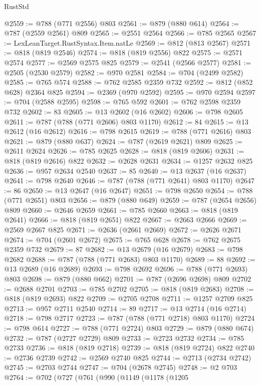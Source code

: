 \begin{lexlean}{RustStd}
\begin{coremodule}
@2559 := @788 (@771 @2556) @803
@2561 := @879 (@880 @614)
@2564 := @787 (@2559 @2561) @809
@2565 := @2551 @2564
@2566 := @785 @2565
@2567 := LexLeanTarget.RustSyntax.Item.natLe
@2569 := @812 (@813 @2567)
@2571 := @818 (@819 @2546)
@2574 := @818 (@819 @2556) @822
@2575 := @2571 @2574
@2577 := @2569 @2575 @825
@2579 := @2541 (@2566 @2577)
@2581 := @2505 (@2530 @2579)
@2582 := @970 @2581
@2584 := @704 (@2499 @2582)
@2585 := @765 @574
@2588 := @762 @2585 @2359 @732
@2592 := @812 (@852 @628) @2364 @825
@2594 := @2369 (@970 @2592)
@2595 := @970 @2594
@2597 := @704 (@2588 @2595)
@2598 := @765 @592
@2601 := @762 @2598 @2359 @732
@2602 := 83
@2605 := @13 @2602 (@16 @2602)
@2606 := @798 @2605
@2611 := @787 (@788 (@771 @2606) @803 @1170)
@2612 := 84
@2615 := @13 @2612 (@16 @2612)
@2616 := @798 @2615
@2619 := @788 (@771 @2616) @803
@2621 := @879 (@880 @637)
@2624 := @787 (@2619 @2621) @809
@2625 := @2611 @2624
@2626 := @785 @2625
@2628 := @818 (@819 @2606)
@2631 := @818 (@819 @2616) @822
@2632 := @2628 @2631
@2634 := @1257 @2632 @825
@2636 := @957 @2634 @2540
@2637 := 85
@2640 := @13 @2637 (@16 @2637)
@2641 := @798 @2640
@2646 := @787 (@788 (@771 @2641) @803 @1170)
@2647 := 86
@2650 := @13 @2647 (@16 @2647)
@2651 := @798 @2650
@2654 := @788 (@771 @2651) @803
@2656 := @879 (@880 @649)
@2659 := @787 (@2654 @2656) @809
@2660 := @2646 @2659
@2661 := @785 @2660
@2663 := @818 (@819 @2641)
@2666 := @818 (@819 @2651) @822
@2667 := @2663 @2666
@2669 := @2569 @2667 @825
@2671 := @2636 (@2661 @2669)
@2672 := @2626 @2671
@2674 := @704 (@2601 @2672)
@2675 := @765 @628
@2678 := @762 @2675 @2359 @732
@2679 := 87
@2682 := @13 @2679 (@16 @2679)
@2683 := @798 @2682
@2688 := @787 (@788 (@771 @2683) @803 @1170)
@2689 := 88
@2692 := @13 @2689 (@16 @2689)
@2693 := @798 @2692
@2696 := @788 (@771 @2693) @803
@2698 := @879 (@880 @662)
@2701 := @787 (@2696 @2698) @809
@2702 := @2688 @2701
@2703 := @785 @2702
@2705 := @818 (@819 @2683)
@2708 := @818 (@819 @2693) @822
@2709 := @2705 @2708
@2711 := @1257 @2709 @825
@2713 := @957 @2711 @2540
@2714 := 89
@2717 := @13 @2714 (@16 @2714)
@2718 := @798 @2717
@2723 := @787 (@788 (@771 @2718) @803 @1170)
@2724 := @798 @614
@2727 := @788 (@771 @2724) @803
@2729 := @879 (@880 @674)
@2732 := @787 (@2727 @2729) @809
@2733 := @2723 @2732
@2734 := @785 @2733
@2736 := @818 (@819 @2718)
@2739 := @818 (@819 @2724) @822
@2740 := @2736 @2739
@2742 := @2569 @2740 @825
@2744 := @2713 (@2734 @2742)
@2745 := @2703 @2744
@2747 := @704 (@2678 @2745)
@2748 := @2 @703
@2764 := @702
    (@727
      (@761
        (@990
          (@1149
            (@1178
              (@1205

\end{coremodule}
\end{lexlean}
